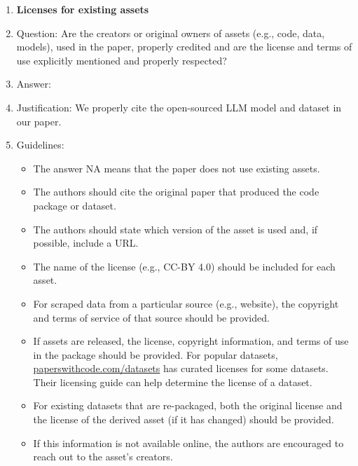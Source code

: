 \documentclass{article}
\begin{document}
\begin{enumerate}
\item {\bf Licenses for existing assets}
    \item[] Question: Are the creators or original owners of assets (e.g., code, data, models), used in the paper, properly credited and are the license and terms of use explicitly mentioned and properly respected?
    \item[] Answer: \answerYes{} %
    \item[] Justification: We properly cite the open-sourced LLM model and dataset in our paper.
    \item[] Guidelines:
    \begin{itemize}
        \item The answer NA means that the paper does not use existing assets.
        \item The authors should cite the original paper that produced the code package or dataset.
        \item The authors should state which version of the asset is used and, if possible, include a URL.
        \item The name of the license (e.g., CC-BY 4.0) should be included for each asset.
        \item For scraped data from a particular source (e.g., website), the copyright and terms of service of that source should be provided.
        \item If assets are released, the license, copyright information, and terms of use in the package should be provided. For popular datasets, \url{paperswithcode.com/datasets} has curated licenses for some datasets. Their licensing guide can help determine the license of a dataset.
        \item For existing datasets that are re-packaged, both the original license and the license of the derived asset (if it has changed) should be provided.
        \item If this information is not available online, the authors are encouraged to reach out to the asset's creators.
    \end{itemize}


\end{enumerate}
\end{document}
